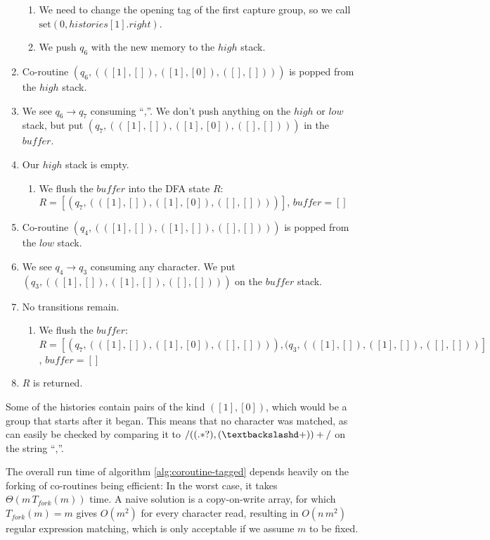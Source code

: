 \documentclass[11pt,a4paper,twoside,openright]{Thesis}
\theoremstyle{definition}
\newcommand{\regex}[1]{\ensuremath{\mathtt{/#1/}}}
\newcommand{\str}[1]{``#1''}
\begin{document}
\begin{example}
\begin{enumerate}
\begin{enumerate}
    \item We need to change the opening tag of the first capture group, so we 
      call $\mbox{set}(0, histories[1].right)$.
    \item We push $q_6$ with the new memory to the $high$ stack.
  \end{enumerate}
\item Co-routine $(q_6,(([1], []), ([1], [0]), ([], [])))$ is popped from the
  $high$ stack.
\item We see $q_6\rightarrow q_7$ consuming \str{,}. We don't push anything 
  on the $high$ or $low$ stack, but put 
  $(q_7, (([1], []), ([1], [0]), ([], [])))$ in the $buffer$.
\item Our $high$ stack is empty.
  \begin{enumerate}
    \item We flush the $buffer$ into the DFA state $R$: 
      $R=[(q_7, (([1], []), ([1], [0]), ([], [])))]$, $buffer=[]$
  \end{enumerate}
\item Co-routine $(q_4, (([1], []), ([1], []), ([], [])))$ is popped from the
  $low$ stack.
\item We see $q_4\rightarrow q_3$ consuming any character. We put 
  $(q_3, (([1], []), ([1], []), ([], [])))$ on the $buffer$ stack.
\item No transitions remain.
  \begin{enumerate}
    \item We flush the $buffer$: 
      $R=[(q_7, (([1], []), ([1], [0]), ([], []))), (q_3, (([1], []), ([1],
      []), ([], []))]$, $buffer=[]$
  \end{enumerate}
\item $R$ is returned.
\end{enumerate}
\end{example}

Some of the histories contain pairs of the kind $([1], [0])$, which would be 
a group that starts after it began. This means that no character was matched, 
as can easily be checked by comparing it to \regex{((.*?),(\textbackslash d+))+} on 
the string \str{,}.

The overall run time of algorithm \ref{alg:coroutine-tagged} depends heavily on the
forking of co-routines being efficient: In the worst case, it takes
$\Theta(m\, T_{fork}(m))$ time. A naive solution is a copy-on-write array, for
which $T_{fork}(m)=m$ gives $O(m^2)$ for every character read, resulting
in $O(n\,m^2)$ regular expression matching, which is only acceptable
if we assume $m$ to be fixed.
\end{document}
